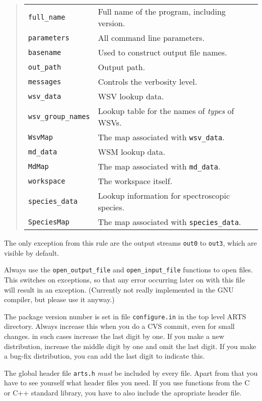    \begin{quote}
   \begin{tabular}{ll}
   \verb|full_name|&         Full name of the program, including version.\\
   \verb|parameters|&        All command line parameters.\\
   \verb|basename|&          Used to construct output file names.\\
   \verb|out_path|&          Output path.\\
   \verb|messages|&          Controls the verbosity level.\\
   \verb|wsv_data|&          WSV lookup data.\\
   \verb|wsv_group_names|&   Lookup table for the names of \emph{types} of WSVs.\\
   \verb|WsvMap|&            The map associated with \verb|wsv_data|. \\
   \verb|md_data|&           WSM lookup data.\\
   \verb|MdMap|&             The map associated with \verb|md_data|. \\
   \verb|workspace|&         The workspace itself.\\
   \verb|species_data|&      Lookup information for spectroscopic species.\\
   \verb|SpeciesMap|&        The map associated with \verb|species_data|.
   \end{tabular}
   \end{quote}
   The only exception from this rule are the output streams \verb|out0| to
   \verb|out3|, which are visible by default.

Always use the \verb|open_output_file| and \verb|open_input_file|
functions to open files. This switches on exceptions, so that any
error occurring later on with this file will result in an
exception. (Currently not really implemented in the GNU compiler,
but please use it anyway.)

The package version number is set in file \verb|configure.in| in the
top level ARTS directory. Always increase this when you do a CVS
commit, even for small changes. in such cases increase the last digit
by one. If you make a new distribution, increase the middle digit by
one and omit the last digit. If you make a bug-fix distribution, you
can add the last digit to indicate this. 

The global header file \verb|arts.h| \emph{must} be included by every
file. Apart from that you have to see yourself what header files you
need. If you use functions from the C or C++ standard library, you
have to also include the apropriate header file.

